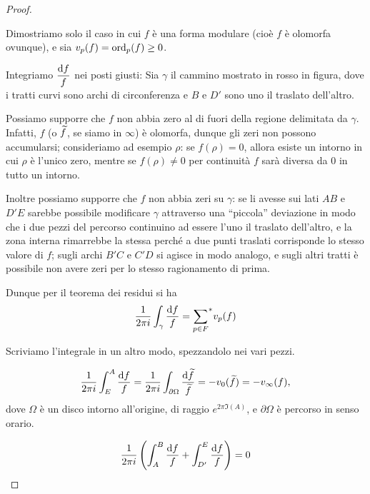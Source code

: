 \begin{proof}
	\begin{figure}
		
	\end{figure}
	Dimostriamo solo il caso in cui $f$ è una forma modulare (cioè $f$ è olomorfa ovunque), e sia $v_p(f)=\text{ord}_p(f)\geq0$.
	
	Integriamo $\displaystyle \frac{\text{d} f}{f}$ nei posti giusti: Sia $\gamma$ il cammino mostrato in rosso in figura, dove i tratti curvi sono archi di circonferenza e $B$ e $D'$ sono uno il traslato dell'altro.
	
	Possiamo supporre che $f$ non abbia zero al di fuori della regione delimitata da $\gamma$.
	Infatti, $f$ (o $\widetilde{f}$, se siamo in $\infty$) è olomorfa, dunque gli zeri non possono accumularsi; consideriamo ad esempio $\rho$: se $f(\rho)=0$, allora esiste un intorno in cui $\rho$ è l'unico zero, mentre se $f(\rho)\neq0$ per continuità $f$ sarà diversa da $0$ in tutto un intorno.
	
	Inoltre possiamo supporre che $f$ non abbia zeri su $\gamma$: se li avesse sui lati $AB$ e $D'E$ sarebbe possibile modificare $\gamma$ attraverso una ``piccola'' deviazione in modo che i due pezzi del percorso continuino ad essere l'uno il traslato dell'altro, e la zona interna rimarrebbe la stessa perché a due punti traslati corrisponde lo stesso valore di $f$; sugli archi $B'C$ e $C'D$ si agisce in modo analogo, e sugli altri tratti è possibile non avere zeri per lo stesso ragionamento di prima.
	
	Dunque per il teorema dei residui si ha
	\begin{equation*}
		\frac{1}{2\pi i} \int_{\gamma} \frac{\text{d} f}{f}={\sum_{p\in F}}^{*}v_p(f)
	\end{equation*}
	
	Scriviamo l'integrale in un altro modo, spezzandolo nei vari pezzi.
	
	\begin{equation*}
		\frac{1}{2\pi i}\int_E^A\frac{\text{d} f}{f}=\frac{1}{2\pi i}\int_{\partial\Omega}\frac{\text{d} \widetilde{f}}{\widetilde{f}}=-v_0(\widetilde{f})=-v_\infty(f),
	\end{equation*}
	dove $\Omega$ è un disco intorno all'origine, di raggio $e^{2\pi \Im(A)}$, e $\partial\Omega$ è percorso in senso orario.
	
	\begin{equation*}
		\frac{1}{2\pi i}\left( \int_A^B\frac{\text{d} f}{f} + \int_{D'}^E\frac{\text{d} f}{f} \right) =0
	\end{equation*}
	

\end{proof}
